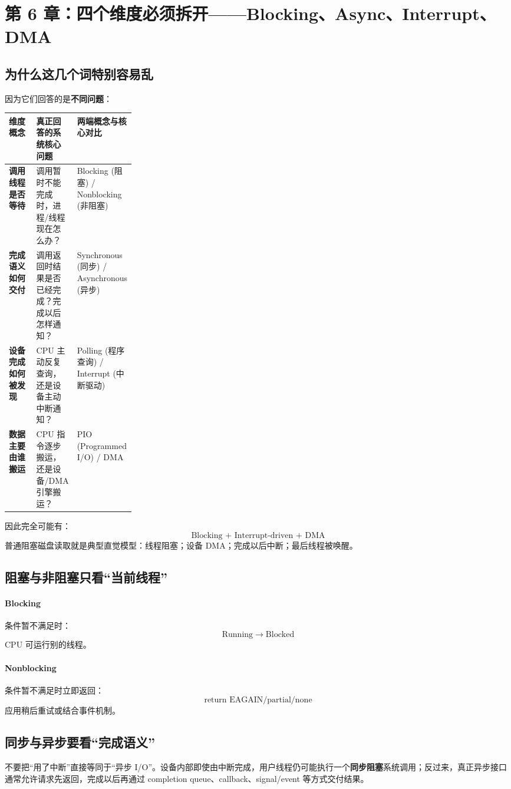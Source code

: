 \documentclass[11pt,a4paper]{ctexart}
\newcommand{\kw}[1]{\textbf{#1}}
\newcommand{\arr}{\;\longrightarrow\;}
\begin{document}
\section{第 6 章：四个维度必须拆开——Blocking、Async、Interrupt、DMA}

\subsection{为什么这几个词特别容易乱}
因为它们回答的是\kw{不同问题}：

\begingroup
\small
\renewcommand{\arraystretch}{1.25}
\setlength{\tabcolsep}{6pt}
\begin{tabularx}{\linewidth}{>{\bfseries}p{0.25\linewidth} X X}
\toprule
维度概念 & 真正回答的系统核心问题 & 两端概念与核心对比 \\
\midrule
调用线程是否等待 & 调用暂时不能完成时，进程/线程现在怎么办？ & Blocking (阻塞) / Nonblocking (非阻塞) \\
完成语义如何交付 & 调用返回时结果是否已经完成？完成以后怎样通知？ & Synchronous (同步) / Asynchronous (异步) \\
设备完成如何被发现 & CPU 主动反复查询，还是设备主动中断通知？ & Polling (程序查询) / Interrupt (中断驱动) \\
数据主要由谁搬运 & CPU 指令逐步搬运，还是设备/DMA 引擎搬运？ & PIO (Programmed I/O) / DMA \\
\bottomrule
\end{tabularx}
\endgroup

因此完全可能有：
\[
\boxed{\text{Blocking + Interrupt-driven + DMA}}
\]
普通阻塞磁盘读取就是典型直觉模型：线程阻塞；设备 DMA；完成以后中断；最后线程被唤醒。

\subsection{阻塞与非阻塞只看“当前线程”}
\paragraph{Blocking}
条件暂不满足时：
\[
\text{Running}\arr\text{Blocked}
\]
CPU 可运行别的线程。

\paragraph{Nonblocking}
条件暂不满足时立即返回：
\[
\text{return EAGAIN/partial/none}
\]
应用稍后重试或结合事件机制。

\subsection{同步与异步要看“完成语义”}
不要把“用了中断”直接等同于“异步 I/O”。设备内部即使由中断完成，用户线程仍可能执行一个\kw{同步阻塞}系统调用；反过来，真正异步接口通常允许请求先返回，完成以后再通过 completion queue、callback、signal/event 等方式交付结果。
\end{document}
